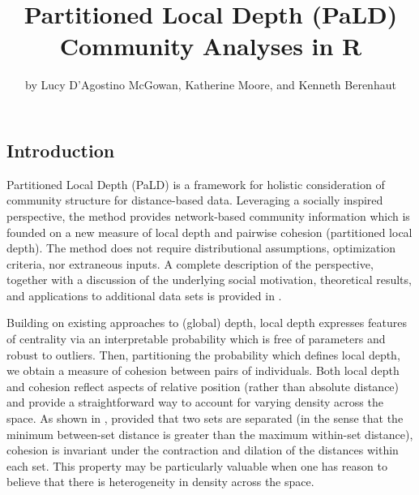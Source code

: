 \title{Partitioned Local Depth (PaLD) Community Analyses in R}
\author{by Lucy D'Agostino McGowan, Katherine Moore, and Kenneth Berenhaut}

\maketitle


\hypertarget{introduction}{%
\subsection{Introduction}\label{introduction}}

Partitioned Local Depth (PaLD) is a framework for holistic consideration
of community structure for distance-based data. Leveraging a socially
inspired perspective, the method provides network-based community
information which is founded on a new measure of local depth and
pairwise cohesion (partitioned local depth). The method does not require
distributional assumptions, optimization criteria, nor extraneous
inputs. A complete description of the perspective, together with a
discussion of the underlying social motivation, theoretical results, and
applications to additional data sets is provided in
\citet{berenhaut2022social}.

Building on existing approaches to (global) depth, local depth expresses
features of centrality via an interpretable probability which is free of
parameters and robust to outliers. Then, partitioning the probability
which defines local depth, we obtain a measure of cohesion between pairs
of individuals. Both local depth and cohesion reflect aspects of
relative position (rather than absolute distance) and provide a
straightforward way to account for varying density across the space. As
shown in \citet{berenhaut2022social}, provided that two sets are
separated (in the sense that the minimum between-set distance is greater
than the maximum within-set distance), cohesion is invariant under the
contraction and dilation of the distances within each set. This property
may be particularly valuable when one has reason to believe that there
is heterogeneity in density across the space.

